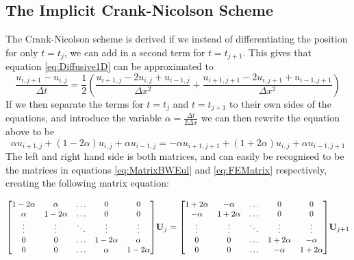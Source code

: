 \documentclass[a4paper,10pt,english]{article}
\renewcommand{\vec}[1]{\mathbf{#1}}
\begin{document}
\subsection*{The Implicit Crank-Nicolson Scheme}
The Crank-Nicolson scheme is derived if we instead of differentiating the position for only $t = t_j$, we can add in a second term for $t = t_{j+1}$. This gives that equation \ref{eq:Diffusive1D} can be approximated to 
\begin{equation}
\dfrac{u_{i,j+1} - u_{i,j}}{\Delta t} = \dfrac{1}{2}\left(\dfrac{u_{i+1,j} - 2 u_{i,j} + u_{i-1,j} }{\Delta x^2} +\dfrac{u_{i+1,j+1} - 2 u_{i,j+1} + u_{i-1,j+1} }{\Delta x^2}\right)
\label{eq:CrankNicDiff}
\end{equation}
If we then separate the terms for $t=t_j$ and $t=t_{j+1}$ to their own sides of the equations, and introduce the variable $\alpha = \tfrac{\Delta t}{2\Delta x}$ we can then rewrite the equation above to be
\begin{equation}
\alpha u_{i+1,j} + (1-2\alpha)u_{i,j} + \alpha u_{i-1,j} = -\alpha u_{i+1,j+1} + (1 + 2\alpha) u_{i,j} + \alpha u_{i-1,j+1}
\label{eq:CrankNicEq}
\end{equation}
The left and right hand side is both matrices, and can easily be recognised to be the matrices in equations \ref{eq:MatrixBWEul} and \ref{eq:FEMatrix} respectively, creating the following matrix equation:

\begin{equation}
 \small{\begin{bmatrix} 1 - 2 \alpha & \alpha  & \hdots & 0 & 0 \\ \alpha & 1 - 2 \alpha  &  \hdots & 0 & 0 \\ \vdots & \vdots  & \ddots & \vdots & \vdots \\0 & 0 &  \hdots & 1 - 2\alpha &  \alpha  \\ 0 & 0  & \hdots &  \alpha  & 1 - 2\alpha \end{bmatrix}} \vec{U}_{j} = \small{\begin{bmatrix}1 + 2 \alpha & -\alpha  & \hdots & 0 & 0 \\ -\alpha & 1 + 2 \alpha & \hdots & 0 & 0  \\ \vdots & \vdots  & \ddots & \vdots & \vdots \\0 & 0 &  \hdots & 1 + 2\alpha &  -\alpha  \\ 0 & 0 & \hdots &  -\alpha  & 1 + 2\alpha \end{bmatrix}} \vec{U}_{j+1}
\end{equation}
\end{document}
